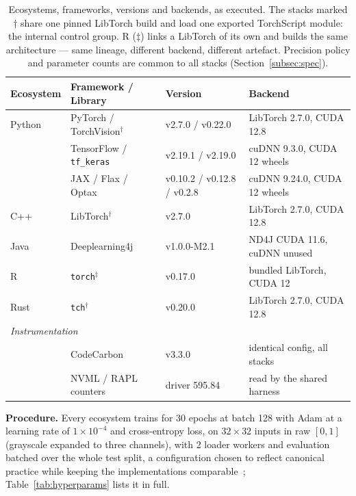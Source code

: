 \begin{table}[t]
\centering
\caption{Ecosystems, frameworks, versions and backends, as executed. The
\vCtrlStacks{} stacks marked $\dagger$ share one pinned LibTorch build and load
one exported TorchScript module: the internal control group. R ($\ddagger$)
links a LibTorch of its own and builds the same architecture --- same lineage,
different backend, different artefact. Precision policy and parameter counts
are common to all stacks (Section~\ref{subsec:spec}).}
\label{tab:frameworks}

\begin{tabularx}{\linewidth}{@{}l l l >{\raggedright\arraybackslash}X@{}}
\toprule
\textbf{Ecosystem} & \textbf{Framework / Library} & \textbf{Version} & \textbf{Backend} \\
\midrule
Python  & PyTorch / TorchVision$^\dagger$ & v2.7.0 / v0.22.0  & LibTorch 2.7.0, CUDA 12.8 \\
        & TensorFlow / \texttt{tf\_keras}  & v2.19.1 / v2.19.0 & cuDNN 9.3.0, CUDA 12 wheels \\
        & JAX / Flax / Optax              & v0.10.2 / v0.12.8 / v0.2.8 & cuDNN 9.24.0, CUDA 12 wheels \\
C++     & LibTorch$^\dagger$              & v2.7.0            & LibTorch 2.7.0, CUDA 12.8 \\
Java    & Deeplearning4j                  & v1.0.0-M2.1       & ND4J CUDA 11.6, cuDNN unused \\
R       & \texttt{torch}$^\ddagger$       & v0.17.0           & bundled LibTorch, CUDA 12 \\
Rust    & \texttt{tch}$^\dagger$          & v0.20.0           & LibTorch 2.7.0, CUDA 12.8 \\
\midrule
\multicolumn{2}{l}{\emph{Instrumentation}} & & \\
        & CodeCarbon                      & v3.3.0            & identical config, all stacks \\
        & NVML / RAPL counters            & driver 595.84     & read by the shared harness \\
\bottomrule
\end{tabularx}
\end{table}

\textbf{Procedure.} Every ecosystem trains for 30 epochs at batch 128 with Adam
at a learning rate of $1\times10^{-4}$ and cross-entropy loss, on $32\times32$
inputs in raw $[0,1]$ (grayscale expanded to three channels), with 2 loader
workers and evaluation batched over the whole test split, a configuration chosen
to reflect canonical practice while keeping the implementations
comparable~\citep{xu2021survey,mehlin2023towards,banbury2021mlperf,pereira2021ranking};
Table~\ref{tab:hyperparams} lists it in full.

